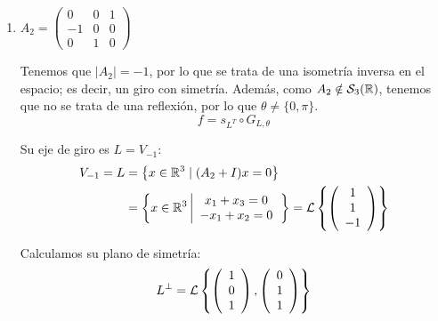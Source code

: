 \begin{ejercicio}
\begin{enumerate}
        \item $A_2=\left(\begin{array}{ccc}
            0 & 0 & 1 \\
            -1 & 0 & 0 \\
            0 & 1 & 0
        \end{array}\right)$

        Tenemos que $|A_2|=-1$, por lo que se trata de una isometría inversa en el espacio; es decir, un giro con simetría. Además, como $A_2\notin \mathcal{S}_3(\mathbb{R})$, tenemos que no se trata de una reflexión, por lo que $\theta\neq \{0,\pi\}$.
        \begin{equation*}
            f=s_{L^T} \circ G_{L,\theta}
        \end{equation*}

        Su eje de giro es $L=V_{-1}$:
        \begin{equation*}
            \begin{split}
                V_{-1}=L& = \left\{x\in \mathbb{R}^3 \mid (A_2+I)x=0\right\}\\
                & = \left\{x\in \mathbb{R}^3 \left|
                \begin{array}{c}
                    x_1+x_3=0 \\
                    -x_1+x_2=0
                \end{array}
                \right.\right\}
                = \mathcal{L}\left\{\left(\begin{array}{c}
                     1 \\ 1 \\ -1
                \end{array}\right)\right\}
            \end{split}
        \end{equation*}

        Calculamos su plano de simetría:
        \begin{equation*}
            L^\perp = \mathcal{L}\left\{\left(\begin{array}{c}
                     1 \\ 0 \\ 1
                \end{array}\right),
                \left(\begin{array}{c}
                     0 \\ 1 \\ 1
                \end{array}\right)\right\}
        \end{equation*}


\end{enumerate}
\end{ejercicio}
